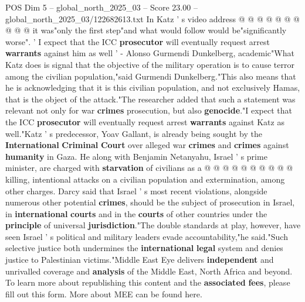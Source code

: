 \begin{textsample}{POS Dim 5 – global\_north\_2025\_03 – Score 23.00 – global\_north\_2025\_03/122682613.txt}
In Katz ' s video address @ @ @ @ @ @ @ @ @ @ it was"only the first step"and what would follow would be"significantly worse". ' I expect that the ICC \textbf{prosecutor} will eventually request arrest \textbf{warrants} against him as well ' - Alonso Gurmendi Dunkelberg, academic"What Katz does is signal that the objective of the military operation is to cause terror among the civilian population,"said Gurmendi Dunkelberg."This also means that he is acknowledging that it is this civilian population, and not exclusively Hamas, that is the object of the attack."The researcher added that such a statement was relevant not only for war \textbf{crimes} prosecution, but also \textbf{genocide}."I expect that the ICC \textbf{prosecutor} will eventually request arrest \textbf{warrants} against Katz as well."Katz ' s predecessor, Yoav Gallant, is already being sought by the \textbf{International} \textbf{Criminal} \textbf{Court} over alleged war \textbf{crimes} and \textbf{crimes} against \textbf{humanity} in Gaza.
He along with Benjamin Netanyahu, Israel ' s prime minister, are charged with \textbf{starvation} of civilians as a @ @ @ @ @ @ @ @ @ @ killing, intentional attacks on a civilian population and extermination, among other charges.
Darcy said that Israel ' s most recent violations, alongside numerous other potential \textbf{crimes}, should be the subject of prosecution in Israel, in \textbf{international} \textbf{courts} and in the \textbf{courts} of other countries under the \textbf{principle} of universal \textbf{jurisdiction}."The double standards at play, however, have seen Israel ' s political and military leaders evade accountability,"he said."Such selective justice both undermines the \textbf{international} \textbf{legal} system and denies justice to Palestinian victims."Middle East Eye delivers \textbf{independent} and unrivalled coverage and \textbf{analysis} of the Middle East, North Africa and beyond.
To learn more about republishing this content and the \textbf{associated} \textbf{fees}, please fill out this form.
More about MEE can be found here.

\end{textsample}
